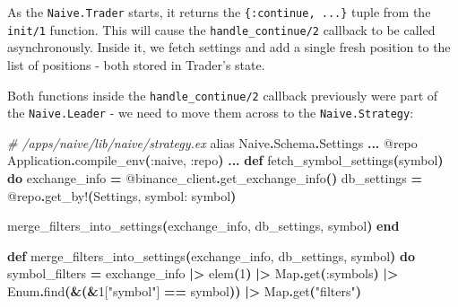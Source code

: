 \documentclass[
  oneside]{book}
\newenvironment{Shaded}{\begin{snugshade}}{\end{snugshade}}
\newcommand{\CommentTok}[1]{\textcolor[rgb]{0.56,0.35,0.01}{\textit{#1}}}
\newcommand{\ConstantTok}[1]{\textcolor[rgb]{0.56,0.35,0.01}{#1}}
\newcommand{\DecValTok}[1]{\textcolor[rgb]{0.00,0.00,0.81}{#1}}
\newcommand{\FunctionTok}[1]{\textcolor[rgb]{0.13,0.29,0.53}{\textbf{#1}}}
\newcommand{\ImportTok}[1]{#1}
\newcommand{\KeywordTok}[1]{\textcolor[rgb]{0.13,0.29,0.53}{\textbf{#1}}}
\newcommand{\NormalTok}[1]{#1}
\newcommand{\OperatorTok}[1]{\textcolor[rgb]{0.81,0.36,0.00}{\textbf{#1}}}
\newcommand{\OtherTok}[1]{\textcolor[rgb]{0.56,0.35,0.01}{#1}}
\newcommand{\StringTok}[1]{\textcolor[rgb]{0.31,0.60,0.02}{#1}}
\newcommand{\VariableTok}[1]{\textcolor[rgb]{0.00,0.00,0.00}{#1}}
\begin{document}
As the \texttt{Naive.Trader} starts, it returns the \texttt{\{:continue,\ ...\}} tuple from the \texttt{init/1} function. This will cause the \texttt{handle\_continue/2} callback to be called asynchronously. Inside it, we fetch settings and add a single fresh position to the list of positions - both stored in Trader's state.

Both functions inside the \texttt{handle\_continue/2} callback previously were part of the \texttt{Naive.Leader} - we need to move them across to the \texttt{Naive.Strategy}:

\begin{Shaded}
\begin{Highlighting}[]
  \CommentTok{\# /apps/naive/lib/naive/strategy.ex}
  \ImportTok{alias} \ConstantTok{Naive}\OperatorTok{.}\ConstantTok{Schema}\OperatorTok{.}\ConstantTok{Settings}
  \OperatorTok{...}
  \OtherTok{@repo} \ConstantTok{Application}\OperatorTok{.}\NormalTok{compile\_env}\FunctionTok{(}\VariableTok{:naive}\NormalTok{, }\VariableTok{:repo}\FunctionTok{)}
  \OperatorTok{...}
  \KeywordTok{def}\NormalTok{ fetch\_symbol\_settings}\FunctionTok{(}\NormalTok{symbol}\FunctionTok{)} \KeywordTok{do}
\NormalTok{    exchange\_info }\OperatorTok{=} \OtherTok{@binance\_client}\OperatorTok{.}\NormalTok{get\_exchange\_info}\FunctionTok{()}
\NormalTok{    db\_settings }\OperatorTok{=} \OtherTok{@repo}\OperatorTok{.}\NormalTok{get\_by!}\FunctionTok{(}\ConstantTok{Settings}\NormalTok{, }\VariableTok{symbol:}\NormalTok{ symbol}\FunctionTok{)}

\NormalTok{    merge\_filters\_into\_settings}\FunctionTok{(}\NormalTok{exchange\_info, db\_settings, symbol}\FunctionTok{)}
  \KeywordTok{end}

  \KeywordTok{def}\NormalTok{ merge\_filters\_into\_settings}\FunctionTok{(}\NormalTok{exchange\_info, db\_settings, symbol}\FunctionTok{)} \KeywordTok{do}
\NormalTok{    symbol\_filters }\OperatorTok{=}
\NormalTok{      exchange\_info}
      \OperatorTok{|\textgreater{}}\NormalTok{ elem}\FunctionTok{(}\DecValTok{1}\FunctionTok{)}
      \OperatorTok{|\textgreater{}} \ConstantTok{Map}\OperatorTok{.}\NormalTok{get}\FunctionTok{(}\VariableTok{:symbols}\FunctionTok{)}
      \OperatorTok{|\textgreater{}} \ConstantTok{Enum}\OperatorTok{.}\NormalTok{find}\FunctionTok{(}\OperatorTok{\&}\FunctionTok{(}\OperatorTok{\&}\DecValTok{1}\OtherTok{[}\StringTok{"symbol"}\OtherTok{]} \OperatorTok{==}\NormalTok{ symbol}\FunctionTok{))}
      \OperatorTok{|\textgreater{}} \ConstantTok{Map}\OperatorTok{.}\NormalTok{get}\FunctionTok{(}\StringTok{"filters"}\FunctionTok{)}


\end{Highlighting}
\end{Shaded}
\end{document}
